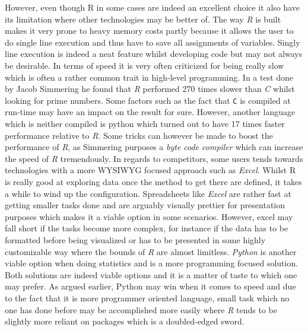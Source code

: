 \documentclass[11pt]{article}
\begin{document}
 However, even though R in some cases are indeed an excellent choice it also have its limitation where other technologies may be better of. The way \textit{R} is built makes it very prone to heavy memory costs partly because it allows the user to do single line execution and thus have to save all assignments of variables. Singly line execution is indeed a neat feature whilst developing code but may not always be desirable.  In terms of speed it is very often criticized for being really slow which is often a rather common trait in high-level programming. In a test done by Jacob Simmering he found that \textit{R} performed 270 times slower than \textit{C} whilst looking for prime numbers. Some factors such as the fact that \texttt{C} is compiled at run-time may have an impact on the result for sure. However, another language which is neither compiled is python which turned out to have 17 times faster performance relative to \textit{R}. Some tricks can however be made to boost the performance of \textit{R}, as Simmering purposes a \textit{byte code compiler} which can increase the speed of \textit{R} tremendously. In regards to competitors, some users tends towards technologies with a more WYSIWYG focused approach such as \textit{Excel}. Whilst R is really good at exploring data once the method to get there are defined, it takes a while to wind up the configuration. Spreadsheets like \textit{Excel} are rather fast at getting smaller tasks done and are arguably visually prettier for presentation purposes which makes it a viable option in some scenarios. However, excel may fall short if the tasks become more complex, for instance if the data has to be formatted before being visualized or has to be presented in some highly customizable way where the bounds of \textit{R} are almost limitless. \textit{Python} is another viable option when doing statistics and is a more programming focused solution. Both solutions are indeed viable options and it is a matter of taste to which one may prefer. As argued earlier, Python may win when it comes to speed and due to the fact that it is more programmer oriented language, small task which no one has done before may be accomplished more easily where \textit{R} tends to be slightly more reliant on packages which is a doubled-edged sword.
\end{document}
